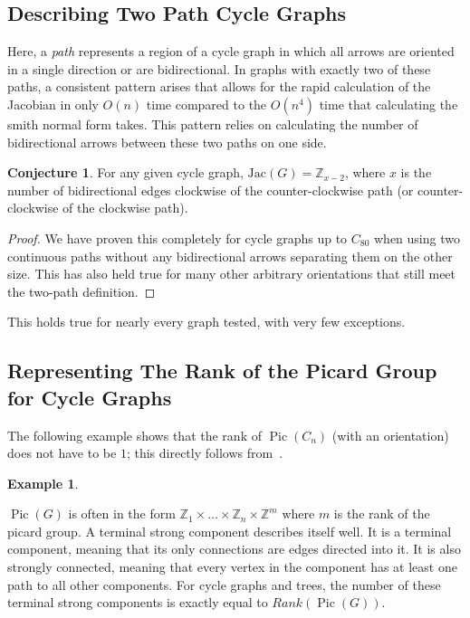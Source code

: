 \documentclass[11pt,reqno]{amsart}
\DeclareMathOperator{\Pic}{Pic}
\newcommand{\Jac}{\textrm{Jac}}{}
\theoremstyle{definition}
\newtheorem{myeg}[mydef]{\textbf{Example}}
\newtheorem{conj}[mydef]{\textbf{Conjecture}}
\theoremstyle{plain}
\begin{document}
	\subsection{Describing Two Path Cycle Graphs}
		Here, a \emph{path} represents a region of a cycle graph in which all arrows are oriented in a single
		direction or are bidirectional.  In graphs with exactly two of these paths, a consistent pattern arises
		that allows for the rapid calculation of the Jacobian in only $O(n)$ time compared to the $O(n^4)$ time
		that calculating the smith normal form takes. This pattern relies on calculating the number
		of bidirectional arrows between these two paths on one side.

		\begin{conj}
			For any given cycle graph, $\Jac(G)=\mathbb{Z}_{x-2}$, where $x$ is the number of
			bidirectional edges clockwise of the counter-clockwise path (or counter-clockwise of the clockwise path).
		\end{conj}
		\begin{proof}
			We have proven this completely for cycle graphs up to $C_{80}$ when using two continuous paths without
			any bidirectional arrows separating them on the other size.  This has also held true for many other
			arbitrary orientations that still meet the two-path definition.
		\end{proof}

		This holds true for nearly every graph tested, with very few exceptions.

	\subsection{Representing The Rank of the Picard Group for Cycle Graphs}
		The following example shows that the rank of $\Pic(C_n)$ (with an orientation) does not have to be $1$;
		this directly follows from~\cite[Corollary 3.5]{wagner2000critical}.

		\begin{myeg}
		\end{myeg}

		$\Pic(G)$ is often in the form $\mathbb{Z}_1 \times \dots \times \mathbb{Z}_n \times \mathbb{Z}^m$ where $m$ is
		the rank of the picard group.  A terminal strong component describes itself well.  It is a terminal component,
		meaning that its only connections are edges directed into it.  It is also strongly connected, meaning that every
		vertex in the component has at least one path to all other components.  For cycle graphs and trees, the number
		of these terminal strong components is exactly equal to $Rank(\Pic(G))$.
\end{document}
